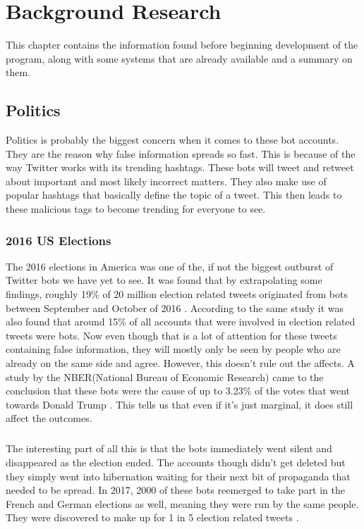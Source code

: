 
\chapter{Background Research}
\label{Chapter2}

This chapter contains the information found before beginning development of the program, along with some systems that are already available and a summary on them. 

\section{Politics}
Politics is probably the biggest concern when it comes to these bot accounts. They are the reason why false information spreads so fast. This is because of the way Twitter works with its trending hashtags. These bots will tweet and retweet about important and most likely incorrect matters. They also make use of popular hashtags that basically define the topic of a tweet. This then leads to these malicious tags to become trending for everyone to see.

\subsection{2016 US Elections}
The 2016 elections in America was one of the, if not the biggest outburst of Twitter bots we have yet to see. It was found that by extrapolating some findings, roughly 19\% of 20 million election related tweets originated from bots between September and October of 2016 \cite{FM7090}. 
According to the same study it was also found that around 15\% of all accounts that were involved in election related tweets were bots. Now even though that is a lot of attention for these tweets containing false information, they will mostly only be seen by people who are already on the same side and agree. However, this doesn't rule out the affects. A study by the NBER(National Bureau of Economic Research) came to the conclusion that these bots were the cause of up to 3.23\% of the votes that went towards Donald Trump \cite{NBERw24631}. 
This tells us that even if it's just marginal, it does still affect the outcomes.
\paragraph{} The interesting part of all this is that the bots immediately went silent and disappeared as the election ended. The accounts though didn't get deleted but they simply went into hibernation waiting for their next bit of propaganda that needed to be spread. In 2017, 2000 of these bots reemerged to take part in the French and German elections as well, meaning they were run by the same people. They were discovered to make up for 1 in 5 election related tweets \cite{motherjonesbot}.

